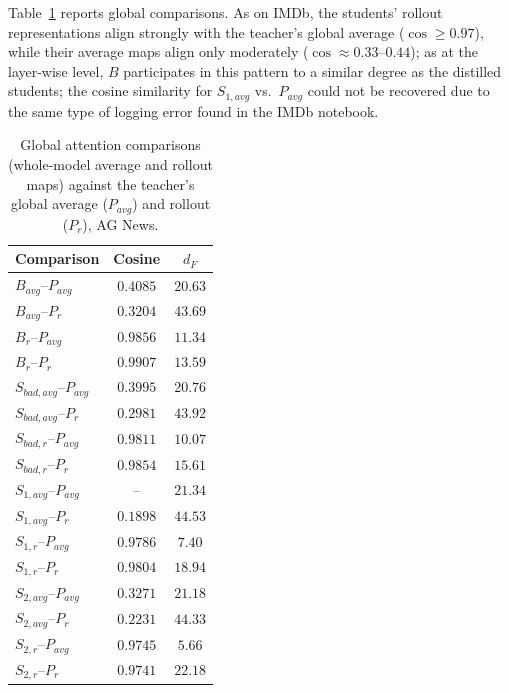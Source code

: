 \documentclass[conference]{IEEEtran}
\begin{document}
Table~\ref{tab:agnews_global} reports global comparisons. As on IMDb, the students' rollout representations align strongly with the teacher's global average ($\cos\ge0.97$), while their average maps align only moderately ($\cos\approx0.33$--$0.44$); as at the layer-wise level, $B$ participates in this pattern to a similar degree as the distilled students; the cosine similarity for $S_{1,avg}$ vs.\ $P_{avg}$ could not be recovered due to the same type of logging error found in the IMDb notebook.

\begin{table}[h!]
\centering
\caption{Global attention comparisons (whole-model average and rollout maps) against the teacher's global average ($P_{avg}$) and rollout ($P_r$), AG News.}
\small
\begin{tabular}{|l|c|c|}
        \hline
        Comparison & Cosine & $d_F$ \\
        \hline
        $B_{avg}$--$P_{avg}$ & $0.4085$ & $20.63$ \\
        $B_{avg}$--$P_r$ & $0.3204$ & $43.69$ \\
        $B_{r}$--$P_{avg}$ & $0.9856$ & $11.34$ \\
        $B_{r}$--$P_r$ & $0.9907$ & $13.59$ \\
        $S_{bad,avg}$--$P_{avg}$ & $0.3995$ & $20.76$ \\
        $S_{bad,avg}$--$P_r$ & $0.2981$ & $43.92$ \\
        $S_{bad,r}$--$P_{avg}$ & $0.9811$ & $10.07$ \\
        $S_{bad,r}$--$P_r$ & $0.9854$ & $15.61$ \\
        $S_{1,avg}$--$P_{avg}$ & -- & $21.34$ \\
        $S_{1,avg}$--$P_r$ & $0.1898$ & $44.53$ \\
        $S_{1,r}$--$P_{avg}$ & $0.9786$ & $7.40$ \\
        $S_{1,r}$--$P_r$ & $0.9804$ & $18.94$ \\
        $S_{2,avg}$--$P_{avg}$ & $0.3271$ & $21.18$ \\
        $S_{2,avg}$--$P_r$ & $0.2231$ & $44.33$ \\
        $S_{2,r}$--$P_{avg}$ & $0.9745$ & $5.66$ \\
        $S_{2,r}$--$P_r$ & $0.9741$ & $22.18$ \\
        \hline
    \end{tabular}
\label{tab:agnews_global}
\end{table}
\end{document}
